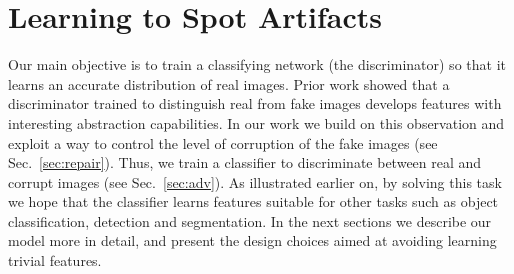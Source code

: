 \documentclass[10pt,twocolumn,letterpaper]{article}
\begin{document}
\section{Learning to Spot Artifacts}

Our main objective is to train a classifying network (the discriminator) so that it learns an accurate distribution of real images. Prior work \cite{radford2015unsupervised} showed that a discriminator trained to distinguish real from fake images develops features with interesting abstraction capabilities. In our work we build on this observation and exploit a way to control the level of corruption of the fake images (see Sec.~\ref{sec:repair}).
Thus, we train a classifier to discriminate between real and corrupt images (see Sec.~\ref{sec:adv}). 
As illustrated earlier on, by solving this task we hope that the classifier learns features suitable for other tasks such as object classification, detection and segmentation. In the next sections we describe our model more in detail, and present the design choices aimed at avoiding learning trivial features.
\end{document}
